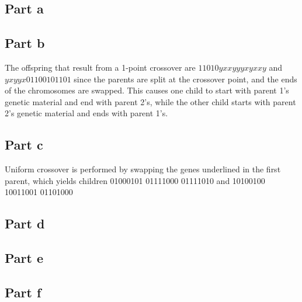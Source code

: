 \documentclass[a4paper]{article}
\begin{document}
\subsection{Part a}

\subsection{Part b}
The offspring that result from a 1-point crossover are $11010yxxyyyxyxxy$ and $yxyyx01100101101$ since the parents are split at the crossover point, and the ends of the chromosomes are swapped.  This causes one child to start with parent 1's genetic material and end with parent 2's, while the other child starts with parent 2's genetic material and ends with parent 1's.

\subsection{Part c}
Uniform crossover is performed by swapping the genes underlined in the first parent, which yields children 01000101 01111000 01111010 and 10100100 10011001 01101000

\subsection{Part d}

\subsection{Part e}

\subsection{Part f}
\end{document}

